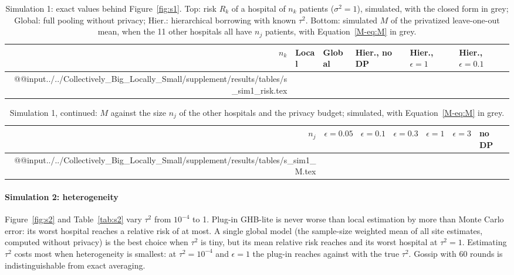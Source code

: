 \documentclass[acmsmall,screen,nonacm]{acmart}
\theoremstyle{acmdefinition}
\begin{document}
\begin{table}[t]
\caption{Simulation 1: exact values behind Figure~\ref{fig:s1}. Top: risk $R_k$ of a hospital of $n_k$ patients ($\sigma^2=1$), simulated, with the closed form in grey; Global: full pooling without privacy; Hier.: hierarchical borrowing with known $\tau^2$. Bottom: simulated $M$ of the privatized leave-one-out mean, when the 11 other hospitals all have $n_j$ patients, with Equation~\eqref{M-eq:M} in grey.}
\label{tab:s1}
\scriptsize
\setlength{\tabcolsep}{4pt}
\begin{tabular}{@{}rlllll@{}}
\toprule
$n_k$ & Local & Global & Hier., no DP & Hier., $\epsilon=1$ & Hier., $\epsilon=0.1$\\
\midrule
\csname @@input\endcsname../../Collectively_Big_Locally_Small/supplement/results/tables/s_sim1_risk.tex 
\bottomrule
\end{tabular}
\end{table}

\begin{table}[t]
\caption{Simulation 1, continued: $M$ against the size $n_j$ of the other hospitals and the privacy budget; simulated, with Equation~\eqref{M-eq:M} in grey.}
\label{tab:s1M}
\scriptsize
\setlength{\tabcolsep}{4pt}
\begin{tabular}{@{}rllllll@{}}
\toprule
$n_j$ & $\epsilon=0.05$ & $\epsilon=0.1$ & $\epsilon=0.3$ & $\epsilon=1$ & $\epsilon=3$ & no DP\\
\midrule
\csname @@input\endcsname../../Collectively_Big_Locally_Small/supplement/results/tables/s_sim1_M.tex 
\bottomrule
\end{tabular}
\end{table}


\paragraph{Simulation 2: heterogeneity} Figure~\ref{fig:s2} and Table~\ref{tab:s2} vary $\tau^2$ from $10^{-4}$ to 1. Plug-in GHB-lite is never worse than local estimation by more than Monte Carlo error: its worst hospital reaches a relative risk of \SimTwoWorstGHB{} at most. A single global model (the sample-size weighted mean of all site estimates, computed without privacy) is the best choice when $\tau^2$ is tiny, but its mean relative risk reaches \SimTwoMeanPool{} and its worst hospital \SimTwoWorstPool{} at $\tau^2=1$. Estimating $\tau^2$ costs most when heterogeneity is smallest: at $\tau^2=10^{-4}$ and $\epsilon=1$ the plug-in reaches \SimTwoMinGHB{} against \SimTwoMinOracle{} with the true $\tau^2$. Gossip with 60 rounds is indistinguishable from exact averaging.
\end{document}
